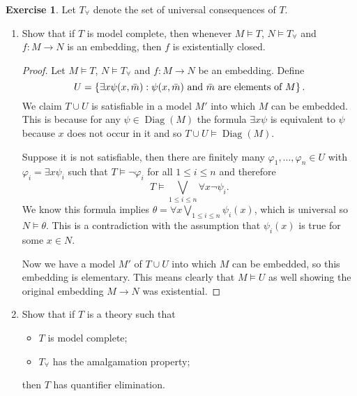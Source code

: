 \documentclass{article}
\newcommand{\setwith}[2]{\left\{#1:#2\right\}}
\DeclareMathOperator{\diagram}{Diag}
\theoremstyle{definition}
\newtheorem{question}{Exercise}
\begin{document}
\begin{question}
    Let \(T_{\forall}\) denote the set of universal consequences of \(T\).

    \begin{enumerate}[(1)]
        \item Show that if \(T\) is model complete, then whenever \(M\models
              T\), \(N\models T_{\forall}\) and \(f:M\to N\) is an embedding,
              then \(f\) is existentially closed.

              \begin{proof}
                  Let \(M\models T\), \(N\models T_{\forall}\) and \(f:M\to N\)
                  be an embedding. Define
                  \[
                      U=\setwith{\exists x\psi(x,\bar{m})}{\textnormal{\(\psi(x,\bar{m})\) and \(\bar{m}\) are elements of \(M\)}}.
                  \]
                  We claim \(T\cup U\) is satisfiable in a model \(M'\) into
                  which \(M\) can be embedded. This is because for any
                  \(\psi\in\diagram(M)\) the formula \(\exists x\psi\) is
                  equivalent to \(\psi\) because \(x\) does not occur in it
                  and so \(T\cup U\models\diagram(M)\).

                  Suppose it is not satisfiable, then there are finitely many
                  \(\varphi_{1},\ldots,\varphi_{n}\in U\) with
                  \(\varphi_{i}=\exists x\psi_{i}\) such that
                  \(T\models\neg\varphi_{i}\) for all \(1\leq i\leq n\) and
                  therefore
                  \[
                      T\models\bigvee_{1\leq i\leq n}\forall x\neg\psi_{i}.
                  \]
                  We know this formula implies \(\theta=\forall x\bigvee_{1\leq
                      i\leq n}\psi_{i}(x)\), which is universal so
                  \(N\models\theta\). This is a contradiction with the
                  assumption that \(\psi_{i}(x)\) is true for some \(x\in
                  N\).

                  Now we have a model \(M'\) of \(T\cup U\) into which \(M\) can
                  be embedded, so this embedding is elementary. This means
                  clearly that \(M\models U\) as well showing the original
                  embedding \(M\to N\) was existential.
              \end{proof}

        \item Show that if \(T\) is a theory such that
              \begin{itemize}
                  \item \(T\) is model complete;
                  \item \(T_{\forall}\) has the amalgamation property;
              \end{itemize}
              then \(T\) has quantifier elimination.


\end{enumerate}
\end{question}
\end{document}
